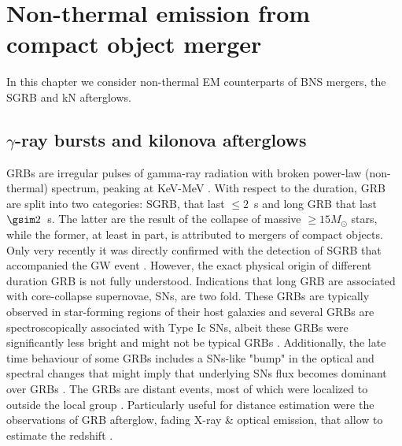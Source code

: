
\chapter{Non-thermal emission from compact object merger} \label{ch:afterglow} 

In this chapter we consider non-thermal \ac{EM} counterparts of \ac{BNS} 
mergers, the \ac{SGRB} and \ac{kN} afterglows.





\section{$\gamma$-ray bursts and kilonova afterglows}

\acp{GRB} are irregular pulses of gamma-ray radiation with broken power-law 
(non-thermal) spectrum, peaking at KeV-MeV \citep{Band:1993,Kouveliotou:1993,Meegan:1992xg}.
%
With respect to the duration, \ac{GRB} are split into two categories: \ac{SGRB}, 
that last ${\leq}2$~s and long \ac{GRB} that last ${\gsim}2$~s. The latter are the 
result of the collapse of massive ${\geq}15M_{\odot}$ stars, while the former, at 
least in part, is attributed to mergers of compact objects. Only very recently it 
was directly confirmed with the detection of \ac{SGRB} \GRB{} that accompanied 
the \ac{GW} event \GW{} \citep{TheLIGOScientific:2017qsa}. However, the exact physical 
origin of different duration \ac{GRB} is not fully understood.
%
Indications that long \ac{GRB} are associated with core-collapse supernovae, \acp{SN}, 
are two fold. These \acp{GRB} are typically observed in star-forming regions of their 
host galaxies \citep[\eg][]{Bloom:2000pq,Bloom:2002hc,Fruchter:2006py,Christensen:2004yx,CastroCeron:2006jh} 
and several \acp{GRB} are spectroscopically associated with Type Ic \acp{SN}, albeit 
these \acp{GRB} were significantly less bright and might not be typical \acp{GRB} 
\citep[\eg][]{Liang:2006ci,Bromberg:2011fm}. Additionally, the late time behaviour 
of some \acp{GRB} includes a \acp{SN}-like "bump" in the optical and spectral changes 
that might imply that underlying \acp{SN} flux becomes dominant over \acp{GRB} 
\citep[\eg][]{Bloom:1999,Woosley:2006fn}.
%
The \acp{GRB} are distant events, most of which were localized to outside the local 
group \citep[\eg][]{Mao:1992,Piran:1992,Fenimore:1993}. Particularly useful for distance 
estimation were the observations of \ac{GRB} afterglow, fading X-ray \& optical emission, 
that allow to estimate the redshift \citep[\eg][]{Costa:1997cg,Frontera:1997ae}.
